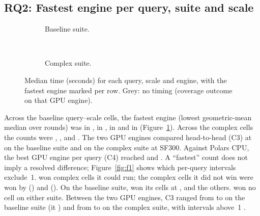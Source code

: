 \documentclass[11pt]{article}
\begin{document}
\subsection{RQ2: Fastest engine per query, suite and scale}
\label{sec:rq2}

\begin{figure}[t]
\centering
\begin{subfigure}[t]{\linewidth}
  \centering{}
  \caption{Baseline suite.}
\end{subfigure}\\[4pt]
\begin{subfigure}[t]{\linewidth}
  \centering{}
  \caption{Complex suite.}
\end{subfigure}
\caption{Median time (seconds) for each query, scale and engine, with the
fastest engine marked per row. Grey: no timing (coverage outcome on that GPU
engine). \chartnote}
\label{fig:f3}
\end{figure}

Across the  baseline query--scale cells,
the fastest engine (lowest geometric-mean median over rounds) was \polarscpu{}
in , \polarsgpu{} in
, \sparkcpu{} in
 and \sparkgpu{} in
 (Figure~\ref{fig:f3}). Across the
 complex cells the counts were
, ,
 and
. The two GPU engines compared
head-to-head (C3) at  on the baseline suite and
 on the complex suite at SF300. Against Polars
CPU, the best GPU engine per query (C4) reached 
and . A ``fastest'' count does not imply a
resolved difference; Figure~\ref{fig:f1} shows which per-query intervals
exclude~1. \polarsgpu{} won 
complex cells it could run; the complex cells it did not win were won by
\sparkgpu{} () and \polarscpu{}
(). On the baseline suite, \polarscpu{}
won its cells at , and \polarsgpu{} the
others. \sparkcpu{} won no cell on either suite. Between the two GPU engines,
C3 ranged from  to 
on the baseline suite (it ) and from
 to  on the complex
suite, with intervals above~1 .
\end{document}
